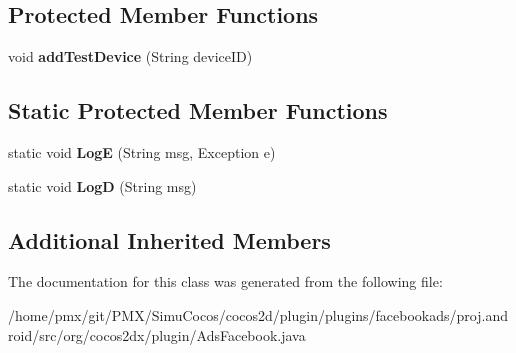 \subsection*{Protected Member Functions}
\begin{DoxyCompactItemize}
\item 
\mbox{\label{classorg_1_1cocos2dx_1_1plugin_1_1AdsFacebook_af1df342777876ebfda0560889c5d9f81}} 
void {\bfseries add\+Test\+Device} (String device\+ID)
\end{DoxyCompactItemize}
\subsection*{Static Protected Member Functions}
\begin{DoxyCompactItemize}
\item 
\mbox{\label{classorg_1_1cocos2dx_1_1plugin_1_1AdsFacebook_aa7c32d79801bda3f202354b358923039}} 
static void {\bfseries LogE} (String msg, Exception e)
\item 
\mbox{\label{classorg_1_1cocos2dx_1_1plugin_1_1AdsFacebook_a65bc9ec48b10db63247286abea8f0e0a}} 
static void {\bfseries LogD} (String msg)
\end{DoxyCompactItemize}
\subsection*{Additional Inherited Members}


The documentation for this class was generated from the following file\+:\begin{DoxyCompactItemize}
\item 
/home/pmx/git/\+P\+M\+X/\+Simu\+Cocos/cocos2d/plugin/plugins/facebookads/proj.\+android/src/org/cocos2dx/plugin/Ads\+Facebook.\+java\end{DoxyCompactItemize}
